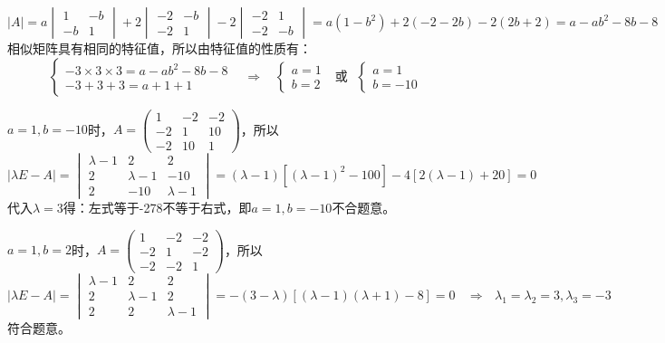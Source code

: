 \documentclass{article}
\begin{document}
\begin{jie}
\begin{equation*}
|A|=a
\begin{vmatrix}
  1 & -b \\
  -b & 1
\end{vmatrix}+2
\begin{vmatrix}
  -2 & -b \\
  -2 & 1
\end{vmatrix}-2
\begin{vmatrix}
  -2 & 1 \\
  -2 & -b
\end{vmatrix}=a(1-b^2)+2(-2-2b)-2(2b+2)=a-ab^2-8b-8
\end{equation*}
相似矩阵具有相同的特征值，所以由特征值的性质有：
\begin{equation*}
\begin{cases}
-3\times3\times3=a-ab^2-8b-8\\
-3+3+3=a+1+1
\end{cases}~~~~\Rightarrow~~~~
\begin{cases}
a=1\\
b=2
\end{cases}~~~\text{或}~~~
\begin{cases}
a=1\\
b=-10
\end{cases}
\end{equation*}

$a=1,b=-10$时，$A=
\begin{pmatrix}
  1 & -2&-2 \\
  -2 & 1 & 10\\
  -2 & 10 &1
\end{pmatrix}$，所以
\begin{equation*}
|\lambda E-A|=
\begin{vmatrix}
  \lambda-1 & 2&2 \\
  2 & \lambda-1 & -10\\
 2 & -10 &\lambda-1
\end{vmatrix}=(\lambda-1)[(\lambda-1)^2-100]-4[2(\lambda-1)+20]=0
\end{equation*}
代入$\lambda=3$得：左式等于-278不等于右式，即$a=1,b=-10$不合题意。

$a=1,b=2$时，$A=
\begin{pmatrix}
  1 & -2&-2 \\
  -2 & 1 & -2\\
  -2 & -2 &1
\end{pmatrix}$，所以
\begin{equation*}
|\lambda E-A|=
\begin{vmatrix}
  \lambda-1 & 2&2 \\
  2 & \lambda-1 & 2\\
 2 & 2 &\lambda-1
\end{vmatrix}=-(3-\lambda)[(\lambda-1)(\lambda+1)-8]=0~~~~\Rightarrow~~~\lambda_1=\lambda_2=3,\lambda_3=-3
\end{equation*}
符合题意。


\end{jie}
\end{document}
